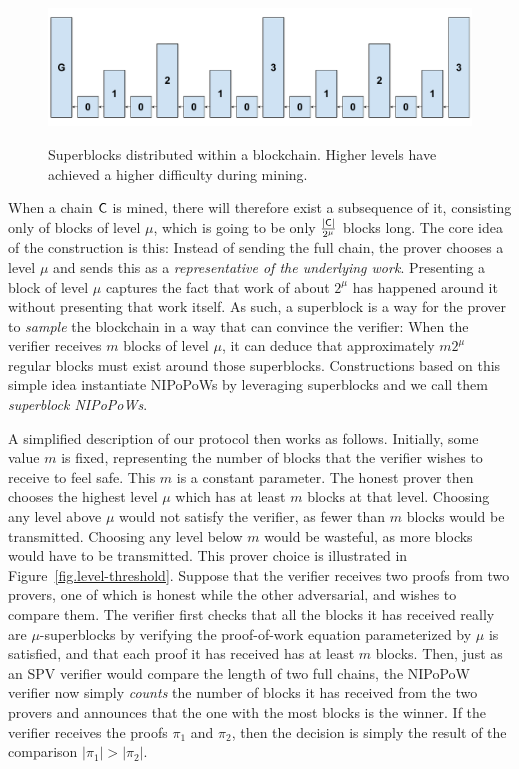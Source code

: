 \begin{figure}[ht]
    \caption{Superblocks distributed within a blockchain.
    Higher levels have achieved a higher difficulty during
    mining.}
    \centering
    \includegraphics[width=0.7\columnwidth,keepaspectratio]{chapters/introduction/figures/superblocks.pdf}
    \label{fig.superblocks}
\end{figure}

When a chain $\mathsf{C}$ is mined, there will therefore exist a subsequence of
it, consisting only of blocks of level $\mu$, which is going to be only
$\frac{|\mathsf{C}|}{2^\mu}$ blocks long. The core idea of the construction is this:
Instead of sending the full chain, the prover chooses a level $\mu$ and sends
this as a \emph{representative of the underlying work}. Presenting a block of
level $\mu$ captures the fact that work of about $2^\mu$ has happened around it
without presenting that work itself. As such, a superblock is a way for the
prover to \emph{sample} the blockchain in a way that can convince the verifier:
When the verifier receives $m$ blocks of level $\mu$, it can deduce that
approximately $m 2^\mu$ regular blocks must exist around those superblocks.
Constructions based on this simple idea instantiate NIPoPoWs by leveraging
superblocks and we call them \emph{superblock NIPoPoWs}.

A simplified description of our protocol then works as follows. Initially, some value
$m$ is fixed, representing the number of blocks that the verifier wishes to
receive to feel safe. This $m$ is a constant parameter. The honest prover then
chooses the highest level $\mu$ which has at least $m$ blocks at that level.
Choosing any level above $\mu$ would not satisfy the verifier, as fewer than $m$
blocks would be transmitted. Choosing any level below $m$ would be wasteful, as
more blocks would have to be transmitted. This prover choice is illustrated in
Figure~\ref{fig.level-threshold}. Suppose that the verifier receives two
proofs from two provers, one of which is honest while the other adversarial, and
wishes to compare them. The verifier first checks that all the blocks it has
received really are $\mu$-superblocks by verifying the proof-of-work equation
parameterized by $\mu$ is satisfied, and that each proof it has received has at
least $m$ blocks. Then, just as an SPV verifier would compare the length of two
full chains, the NIPoPoW verifier now simply \emph{counts} the number of blocks
it has received from the two provers and announces that the one with the most
blocks is the winner. If the verifier receives the proofs $\pi_1$ and $\pi_2$,
then the decision is simply the result of the comparison $|\pi_1| > |\pi_2|$.


